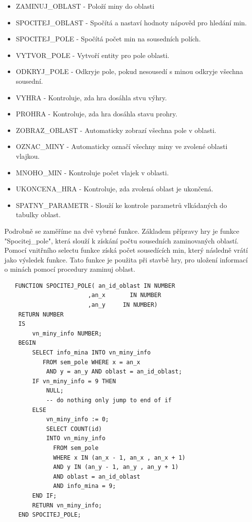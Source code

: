 \documentclass[12pt, a4paper]{article}
\begin{document}
\begin{itemize}
\item ZAMINUJ\_OBLAST - Položí miny do oblasti   
\item SPOCITEJ\_OBLAST - Spočítá a nastaví hodnoty nápověd pro hledání min.
\item SPOCITEJ\_POLE - Spočítá počet min na sousedních polích. 
\item VYTVOR\_POLE - Vytvoří entity pro pole oblasti.
\item ODKRYJ\_POLE - Odkryje pole, pokud nesousedí s minou odkryje všechna sousední.
\item VYHRA - Kontroluje, zda hra dosáhla stvu výhry.
\item PROHRA - Kontroluje, zda hra dosáhla stavu prohry.
\item ZOBRAZ\_OBLAST - Automaticky zobrazí všechna pole v oblasti.
\item OZNAC\_MINY - Automaticky označí všechny miny ve zvolené oblasti vlajkou. 
\item MNOHO\_MIN - Kontroluje počet vlajek v oblasti.
\item UKONCENA\_HRA - Kontroluje, zda zvolená oblast je ukončená.   
\item SPATNY\_PARAMETR - Slouží ke kontrole parametrů vlkádaných do tabulky oblast.

\end{itemize} 



Podrobně se zaměříme na dvě vybrné funkce. Základem přípravy hry je funkce "Spocitej\_pole", která slouží k získání počtu sousedních zaminovaných oblastí. Pomocí vnitřního selectu funkce získá počet sousedících min, který následně vrátí jako výsledek funkce. Tato funkce je použita při stavbě hry, pro uložení informací o minách pomocí procedury zaminuj oblast.

\begin{verbatim}
   FUNCTION SPOCITEJ_POLE( an_id_oblast IN NUMBER
                        ,an_x       IN NUMBER
                        ,an_y     IN NUMBER)
    RETURN NUMBER
    IS
        vn_miny_info NUMBER;
    BEGIN
        SELECT info_mina INTO vn_miny_info
           FROM sem_pole WHERE x = an_x
            AND y = an_y AND oblast = an_id_oblast;
        IF vn_miny_info = 9 THEN
            NULL;
            -- do nothing only jump to end of if
        ELSE
            vn_miny_info := 0;
            SELECT COUNT(id)
            INTO vn_miny_info 
              FROM sem_pole 
              WHERE x IN (an_x - 1, an_x , an_x + 1) 
              AND y IN (an_y - 1, an_y , an_y + 1) 
              AND oblast = an_id_oblast
              AND info_mina = 9;
        END IF;
        RETURN vn_miny_info;
    END SPOCITEJ_POLE;
\end{verbatim} 
\end{document}
